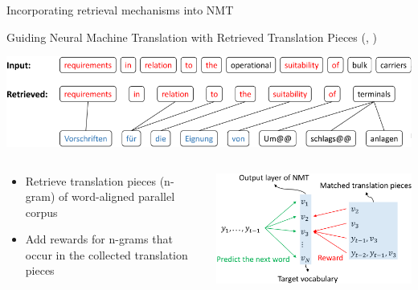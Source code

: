 \documentclass[unicode, 12pt, xdvipdfmx, aspectratio=169]{beamer}
\newcommand{\mycite}[1]{{\scriptsize\reffont({\citeauthor*{#1}, \citeyear{#1}})}}
\begin{document}
\begin{frame}[label={sec:org6ad8692}]{Incorporating retrieval mechanisms into NMT}
\begin{block}{\small Guiding Neural Machine Translation with Retrieved Translation Pieces \mycite{zhang-etal-2018-guiding}}
\vspace{-0.3cm}
\begin{center}
\includegraphics[width=0.8\linewidth]{./figure/zhang-etal-2018-guiding/Figure1.pdf}
\end{center}

\begin{columns}
\begin{column}{0.6\columnwidth}
\vspace{-1cm}
\begin{itemize}
\item Retrieve translation pieces (n-gram) of word-aligned parallel corpus
\item Add rewards for n-grams that occur in the collected translation pieces
\end{itemize}
\end{column}
\begin{column}{0.4\columnwidth}
\vspace{-0.6cm}
\begin{center}
\includegraphics[width=\linewidth]{./figure/zhang-etal-2018-guiding/Figure2.pdf}
\end{center}
\end{column}
\end{columns}
\end{block}
\end{frame}
\end{document}
